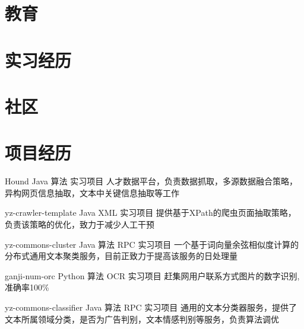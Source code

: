 \documentclass[11pt,a4paper]{moderncv}
\title{}               %
\begin{document}
\maketitle

\section{教育}

\section{实习经历}

\section{社区}

\section{项目经历}
\renewcommand{\baselinestretch}{1.2}

{Hound}
{Java 算法}
{实习项目}{}
{人才数据平台，负责数据抓取，多源数据融合策略，异构网页信息抽取，文本中关键信息抽取等工作}

\vspace*{0.2\baselineskip}
{yz-crawler-template}
{Java XML}
{实习项目}{}
{提供基于XPath的爬虫页面抽取策略，负责该策略的优化，致力于减少人工干预}

\vspace*{0.2\baselineskip}
{yz-commons-cluster}
{Java 算法 RPC}
{实习项目}{}
{一个基于词向量余弦相似度计算的分布式通用文本聚类服务，目前正致力于提高该服务的日处理量}

\vspace*{0.2\baselineskip}
{ganji-num-orc}
{Python 算法 OCR}
{实习项目}{}
{赶集网用户联系方式图片的数字识别, 准确率100\%}

\vspace*{0.2\baselineskip}
{yz-commons-classifier}
{Java 算法 RPC}
{实习项目}{}
{通用的文本分类器服务，提供了文本所属领域分类，是否为广告判别，文本情感判别等服务，负责算法调优}
\end{document}
